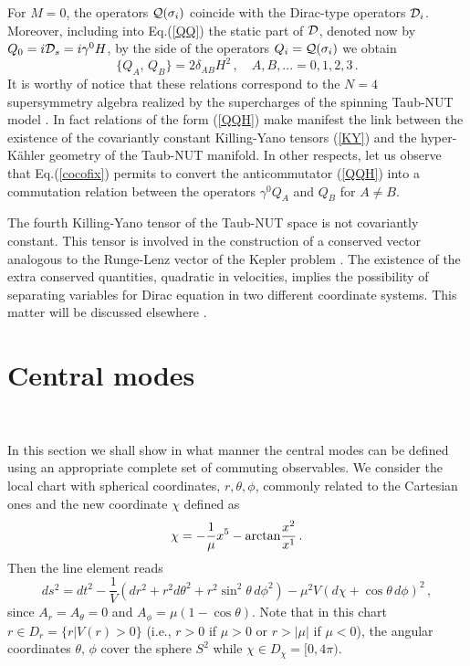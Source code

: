 \documentclass[a4paper,12pt]{article}
\begin{document}
For $M = 0$, the  operators  ${\cal Q}(\sigma_{i})$ coincide 
with the Dirac-type operators ${\cal D}_{i}$. Moreover, including into 
Eq.(\ref{QQ}) the static part of ${\cal D}$, denoted now by $Q_{0}=
i{\cal D}_{s}=i\gamma^{0}H$,
by the side of the operators $Q_{i}={\cal Q}(\sigma_{i})$ we obtain 
\begin{equation}\label{QQH}
\{Q_{A},\,Q_{B}\}=2\delta_{AB}H^2\,, \quad A,B,...=0,1,2,3\,.
\end{equation}  
It is worthy of notice that these relations correspond to the $N = 4$ 
supersymmetry algebra realized by the supercharges of the spinning 
Taub-NUT model \cite{GR,G2,G3}. In fact  relations of the form (\ref{QQH})
make manifest the link between the existence of the covariantly constant
Killing-Yano tensors (\ref{KY}) and the hyper-K\" ahler geometry of the 
Taub-NUT manifold. In other respects, let us observe that Eq.(\ref{cocofix})
permits to convert the anticommutator (\ref{QQH}) into a 
commutation relation between the operators $\gamma^0 Q_A$ and $Q_B$ for 
$A\neq B$.

The fourth Killing-Yano tensor of the Taub-NUT space is not covariantly 
constant. This tensor is involved in the construction of 
a conserved vector analogous to the Runge-Lenz vector of the Kepler problem
\cite{GR,G2,G3}.
The existence of the extra conserved quantities, quadratic in velocities, 
implies the possibility of separating variables for Dirac equation in two
different coordinate systems. This matter will be discussed elsewhere 
\cite{CV1}. 

\section{Central modes}
\

In this section we shall show in what manner the central modes can be 
defined using  an appropriate complete set of commuting observables. 
We  consider the local chart with spherical coordinates,  $r, \theta, \phi$, 
commonly related to the Cartesian ones  and the new coordinate $\chi$ 
defined as 
\begin{equation}
\chi=-\frac{1}{\mu}x^{5}-{\rm arctan}\frac{x^2}{x^1}\,.
\end{equation}
Then the line element reads 
\begin{equation}
ds^{2}=dt^{2}-\frac{1}{V}(dr^{2}+r^{2}d\theta^{2}+ 
r^{2}\sin^{2}\theta\, d\phi^{2})-\mu^{2}V(d\chi+\cos\theta\, d\phi)^{2}\,,  
\end{equation}
since $A_{r}=A_{\theta}=0$ and $A_{\phi}=\mu(1-\cos\theta)$. Note that in 
this chart   $r\in D_{r}=\{r|V(r)>0\}$ (i.e., $r>0$ if $\mu>0$ or $r>|\mu|$ if 
$\mu<0$), the angular coordinates $\theta,\,\phi$ cover the sphere $S^{2}$ 
while $\chi\in D_{\chi}=[0,4\pi)$. 
\end{document}
